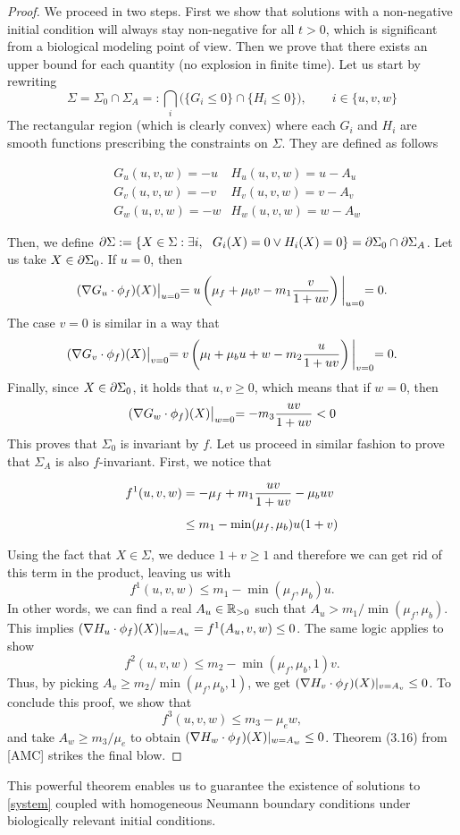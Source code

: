 \begin{proof}
	We proceed in two steps. First we show that solutions with a non-negative initial condition will always stay non-negative for all $t>0$, which is significant from a  biological modeling point of view. Then we prove that there exists an upper bound for each quantity (no explosion in finite time). Let us start by rewriting $$\Sigma = \Sigma_0 \cap \Sigma_A =: \bigcap_i \biggl( \{G_i \le 0\} \cap \{H_i \le 0\}\biggr), \qquad i \in \{u, v, w\}$$
	The rectangular region (which is clearly convex) where each $G_i$ and $H_i$ are smooth functions prescribing the constraints on $\Sigma$. They are defined as follows
	
	\begin{align*}
		& G_u(u, v, w) = -u & H_u(u, v, w) = u - A_u \\[1em]
		& G_v(u, v, w) = -v & H_v(u, v, w) = v - A_v \\[1em]
		& G_w(u, v, w) = -w & H_w(u, v, w) = w - A_w
	\end{align*}

	Then, we define $\partial\Sigma := \{X \in \Sigma : \exists i, \ \  G_i(X) = 0 \lor H_i(X) = 0 \} = \partial \Sigma_0 \cap \partial \Sigma_A$. Let us take $X \in \partial \Sigma_0$. If $u=0$, then $$(\nabla G_u \cdot \phi_f)(X)\bigl\vert_{u=0} = u \left( \mu_f  + \mu_b v - m_1 \dfrac{v}{1 + uv}\right)\biggl\vert_{u=0} = 0.$$ The case $v= 0$ is similar in a way that
	$$(\nabla G_v \cdot \phi_f)(X)\bigl\vert_{v=0} = v \left( \mu_l  + \mu_b u + w - m_2 \dfrac{u}{1 + uv}\right)\biggl\vert_{v=0} = 0.$$ Finally, since $X \in \partial\Sigma_0$, it holds that $u, v \ge 0$, which means that if $w=0$, then $$(\nabla G_w \cdot \phi_f)(X)\bigl\vert_{w=0} = -m_3 \dfrac{uv}{1 + uv} < 0$$ This proves that $\Sigma_0$ is invariant by $f$. Let us proceed in similar fashion to prove that $\Sigma_A$ is also $f$-invariant. First, we notice that
	
	\begin{align}
		f^1(u, v, w) &= -\mu_f + m_1 \dfrac{uv}{1 + uv} - \mu_b uv \notag \\[0.5em]
		& \le m_1 - \min(\mu_f, \mu_b) u (1 + v) \notag
	\end{align}
	
	Using the fact that $X \in \Sigma$, we deduce $1 + v \ge 1$ and therefore we can get rid of this term in the product, leaving us with 
	$$f^1(u, v, w) \le m_1 - \min(\mu_f, \mu_b) u.$$
	In other words, we can find a real $A_u \in \mathbb{R}_{>0}$ such that $A_u > m_1 / \min(\mu_f, \mu_b)$. This implies $(\nabla H_u \cdot \phi_f)(X)\vert_{u=A_u} = f^1(A_u, v, w) \le 0$. The same logic applies to show $$f^2(u, v, w) \le m_2 - \min(\mu_f, \mu_b, 1) v.$$ Thus, by picking $A_v \ge m_2 / \min(\mu_f, \mu_b, 1)$, we get $(\nabla H_v \cdot \phi_f)(X)\vert_{v=A_v} \le 0$. To conclude this proof, we show that $$f^3(u, v, w) \le m_3 - \mu_e w,$$ and take $A_w \ge m_3 / \mu_e$ to obtain $(\nabla H_w \cdot \phi_f)(X)\vert_{w=A_w} \le 0$. Theorem (3.16) from [AMC] strikes the final blow.	
\end{proof}

This powerful theorem enables us to guarantee the existence of solutions to \ref{system} coupled with homogeneous Neumann boundary conditions under biologically relevant initial conditions. 



